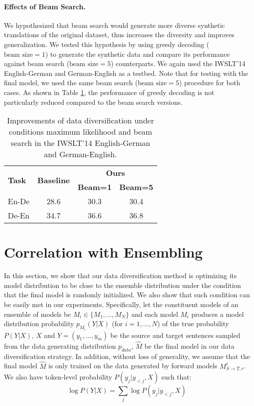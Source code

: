 \documentclass{article}
\begin{document}
\paragraph{Effects of Beam Search.} 
We hypothesized that beam search would generate more diverse synthetic translations of the original dataset, thus increases the diversity and improves generalization. We tested this hypothesis by using greedy decoding ($\text{beam size}=1$) to generate the synthetic data and compare its performance against beam search ($\text{beam size}=5$) counterparts. We again used the IWSLT'14 English-German and German-English as a testbed. Note that for testing with the final model, we used the same beam search ($\text{beam size} = 5$) procedure for both cases. As shown in Table \ref{table:effect_beam}, the performance of greedy decoding is not particularly reduced compared to the beam search versions.

\begin{table}[t]
\begin{center}
\caption{Improvements of data diversification under conditions maximum likelihood and beam search in the IWSLT'14 English-German and German-English.}
\begin{tabular}{lccc}
\toprule
\multirow{2}{*}{\bf Task}   & \multirow{2}{*}{\bf Baseline} & \multicolumn{2}{c}{\bf Ours}\\
\cmidrule{3-4}
{\bf }                  & {\bf }    & {\bf Beam=1}    & {\bf Beam=5}\\
\midrule
En-De	& 28.6	& 30.3	& 30.4\\
De-En	& 34.7	& 36.6	& 36.8\\
\bottomrule
\end{tabular}
\label{table:effect_beam}
\end{center}
\end{table}



\section{Correlation with Ensembling}\label{app:proof}
In this section, we show that our data diversification method is optimizing its model distribution to be close to the ensemble distribution under the condition that the final model is randomly initialized. We also show that such condition can be easily met in our experiments. Specifically, let the constituent models of an ensemble of models be $M_i \in \{M_1,...,M_N\}$ and each model $M_i$ produces a model distribution probability $p_{M_i}(Y|X)$ (for $i= 1, \ldots, N$) of the true probability $P(Y|X)$, $X$ and $Y=(y_1,...,y_m)$ be the source and target sentences sampled from the data generating distribution $p_{data}$, $\hat{M}$ be the final model in our data diversification strategy. 
In addition, without loss of generality, we assume that the final model $\hat{M}$ is only trained on the data generated by forward models $M_{S\rightarrow T,r}^i$. 
We also have token-level probability $P(y_j|y_{<j}, X)$ such that:
\begin{equation}
    \log P(Y|X) = \sum_j \log P(y_j|y_{<j}, X)
\end{equation}
\end{document}
